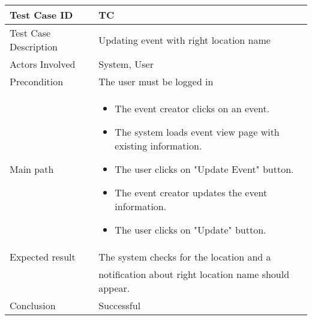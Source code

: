 \begin{center} \begin{tabular}{|l|l|}
  \hline
  Test Case ID & TC \z\\
  \hline
  Test Case Description & Updating event with right location name \\
  \hline
  Actors Involved & System, User\\
   \hline
  Precondition & The user must be logged in\\
  \hline
  Main path &   \begin{minipage}{5in}
    \vskip 4pt
            \begin{itemize}
             \item The event creator clicks on an event.
              \item The system loads event view page with existing information.
              \item The user clicks on "Update Event" button.
              \item The event creator updates the event information.
              \item The user clicks on "Update" button.
            \end{itemize}
    \vskip 4pt
  \end{minipage}  \\
  \hline
  Expected result & The system checks for the location and a\\
  & notification about right location name should appear. \\
  \hline
  Conclusion & Successful\\
  \hline
\end{tabular}\end{center}

